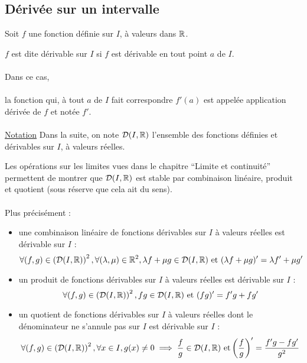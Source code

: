 \subsection{Dérivée sur un intervalle}
Soit \(f\) une fonction définie sur \(I\), à valeurs dans \(\mathbb{R}\).
\begin{defi}
	\(f\) est dite dérivable sur \(I\) si \(f\) est dérivable en tout point \(a\) de \(I\).\\~\\
	Dans ce cas,\\~\\
	la fonction qui, à tout \(a\) de \(I\) fait correspondre \(f '(a)\) est appelée application dérivée de \(f\) et notée \(f '\).\\~\\
	\underline{Notation}
	Dans la suite, on note \(\mathcal{D} (I, \mathbb{R})\) l’ensemble des fonctions définies et dérivables sur \(I\), à valeurs réelles.
\end{defi}

\begin{defprop}
	Les opérations sur les limites vues dans le chapitre “Limite et continuité” permettent de montrer que \(\mathcal{D} (I, \mathbb{R})\) est stable par combinaison linéaire, produit et quotient (sous réserve que cela ait du sens).\\~\\
	Plus précisément :
	\begin{itemize}
		\item une combinaison linéaire de fonctions dérivables sur \(I\) à valeurs réelles est dérivable sur \(I\) :
		      \[\forall(f, g) \in \left(\mathcal{D}(I,\mathbb{R})\right)^2 , \forall(\lambda, \mu) \in \mathbb{R} ^2, \lambda f + \mu g \in \mathcal{D}(I,\mathbb{R})\text{ et }(\lambda f + \mu g)' = \lambda f ' + \mu g'\]
		\item un produit de fonctions dérivables sur \(I\) à valeurs réelles est dérivable sur \(I\) :
		      \[\forall(f, g) \in \left(\mathcal{D}(I,\mathbb{R})\right)^2 , f g \in \mathcal{D}(I,\mathbb{R})\text{ et }(f g)' = f 'g + f g'\]
		\item un quotient de fonctions dérivables sur \(I\) à valeurs réelles dont le dénominateur ne s’annule pas sur \(I\) est dérivable sur \(I\) :
		      \[\forall(f, g) \in \left(\mathcal{D}(I,\mathbb{R})\right)^2 , \forall x \in I, g(x)\neq 0 \implies \frac{f}{g}\in \mathcal{D}(I,\mathbb{R})\text{ et} \left(\frac{f}{g}\right)' = \frac{f 'g - f g'}{g^2}\]
	\end{itemize}
\end{defprop}

